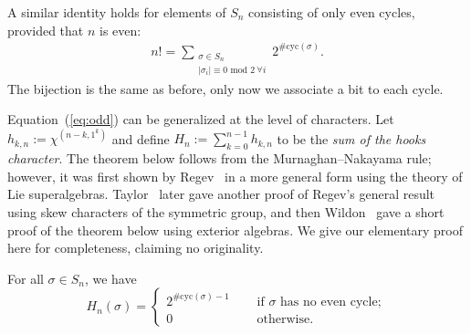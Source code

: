 \documentclass[12pt]{article}
\begin{document}
A similar identity holds for elements of $S_n$ consisting of only even cycles, provided that $n$ is even:
\begin{align}\label{eq:even}
	n! =  \sum_{\substack{\sigma \in S_n \\ |\sigma_i| \equiv 0 \text{ mod } 2~\forall i}}  \!\!\!\! 2^{\#\mathrm{cyc}(\sigma)}.
\end{align}
The bijection is the same as before, only now we associate a bit to each cycle. 


Equation~(\ref{eq:odd}) can be generalized at the level of characters. Let $h_{k,n} := \chi^{(n-k,1^k)}$ and define $H_n := \sum_{k=0}^{n-1} h_{k,n}$ to be the \emph{sum of the hooks character}. The theorem below follows from the Murnaghan--Nakayama rule; however, it was first shown by Regev~\cite{Regev13} in a more general form using the theory of Lie superalgebras. Taylor~\cite{Taylor17} later gave another proof of Regev's general result using skew characters of the symmetric group, and then Wildon~\cite{WildonBlog} gave a short proof of the theorem below using exterior algebras. We give our elementary proof here for completeness, claiming no originality.
\begin{theorem}\label{thm:hooks} For all $\sigma \in S_n$, we have
	$$
		H_n (\sigma) = 
		\begin{cases}
		2^{\#\mathrm{cyc}(\sigma) - 1} \quad& \text{ if } \sigma \text{ has no even cycle};\\
		0 \quad& \text{ otherwise.}
		\end{cases} 
	$$
\end{theorem}
\end{document}
